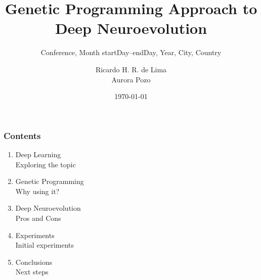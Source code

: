 \documentclass[aspectratio=169]{beamer}
\title{Genetic Programming Approach to Deep Neuroevolution}
\author{Ricardo H. R. de Lima \\ Aurora Pozo}
\date{\today}
\subtitle{\tiny{Conference, Month startDay--endDay, Year, City, Country}}
\begin{document}
	\frame{\titlepage}

	\begin{frame}		
		\frametitle{Contents}
		\begin{enumerate}
			
			\item Deep Learning \\
				\textcolor{ExecusharesGrey}{\small\hspace{1em} Exploring the topic}
			\item Genetic Programming \\
				\textcolor{ExecusharesGrey}{\small\hspace{1em} Why using it?}
			\item Deep Neuroevolution \\
				\textcolor{ExecusharesGrey}{\small\hspace{1em} Pros and Cons}
			\item Experiments \\
				\textcolor{ExecusharesGrey}{\small\hspace{1em} Initial experiments}
			\item Conclusions \\
				\textcolor{ExecusharesGrey}{\small\hspace{1em} Next steps}
			
		\end{enumerate}
	\end{frame}

	\startprogressbar

\end{document}
